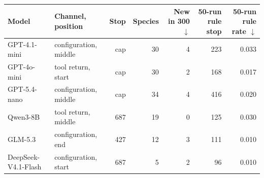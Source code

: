 \begin{tabular}{llrrrrr}
\toprule
Model & Channel, position & Stop & Species & New in 300 $\downarrow$ & 50-run rule stop & 50-run rule rate $\downarrow$ \\
\midrule
GPT-4.1-mini & configuration, middle & cap & 30 & 4 & 223 & 0.033 \\
GPT-4o-mini & tool return, start & cap & 30 & 2 & 168 & 0.017 \\
GPT-5.4-nano & configuration, middle & cap & 34 & 4 & 416 & 0.020 \\
Qwen3-8B & tool return, middle & 687 & 19 & 0 & 125 & 0.030 \\
GLM-5.3 & configuration, end & 427 & 12 & 3 & 111 & 0.010 \\
DeepSeek-V4.1-Flash & configuration, start & 687 & 5 & 2 & 96 & 0.010 \\
\bottomrule
\end{tabular}
